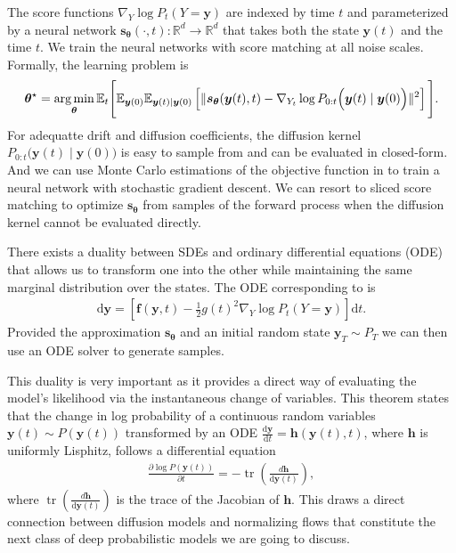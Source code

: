 The score functions $\nabla_Y \log P_t(Y=\bm{y})$ are indexed by time $t$ and parameterized by a neural network $\bm{s}_{\bm{\theta}}(\cdot, t) : \mathbb{R}^d \rightarrow \mathbb{R}^d$ that takes both the state $\bm{y}(t)$ and the time $t$. We train the neural networks with score matching at all noise scales. Formally, the learning problem is
\begin{align}
  \bm{\theta}^\star = \operatorname*{arg\,min}_{\bm{\theta}} \mathbb{E}_t\Bigg[ \mathbb{E}_{\bm{y}(0)} \mathbb{E}_{\bm{y}(t)\mid \bm{y}(0)}\left[ \lVert \bm{s}_{\bm{\theta}}(\bm{y}(t), t) - \nabla_{Y_t} \log P_{0:t}\Big(\bm{y}(t) \mid \bm{y}(0)\Big) \rVert^2 \right] \Bigg]. \label{eq:continuous_diffusion_objective}
\end{align}
For adequatte drift and diffusion coefficients, the diffusion kernel $P_{0:t}\Big(\bm{y}(t) \mid \bm{y}(0)\Big)$ is easy to sample from and can be evaluated in closed-form. And we can use Monte Carlo estimations of the objective function in  to train a neural network with stochastic gradient descent. We can resort to sliced score matching \citep{song2020sliced} to optimize $\bm{s}_{\bm{\theta }}$ from samples of the forward process when the diffusion kernel cannot be evaluated directly.

There exists a duality between SDEs and ordinary differential equations (ODE) that allows us to transform one into the other while maintaining the same marginal distribution over the states. The ODE corresponding to  is
\begin{align}
  \text{d}\bm{y} = \left[ \bm{f}(\bm{y}, t) - \frac{1}{2}g(t)^2 \nabla_Y \log P_t(Y=\bm{y}) \right] \text{d}t.
\end{align}
Provided the approximation $\bm{s}_{\bm{\theta}}$ and an initial random state $\bm{y}_T \sim P_T$ we can then use an ODE solver to generate samples.

This duality is very important as it provides a direct way of evaluating the model's likelihood via the instantaneous change of variables. This theorem states that the change in log probability of a continuous random variables $\bm{y}(t) \sim P(\bm{y}(t))$ transformed by an ODE $\frac{\text{d}\bm{y}}{\text{d}t} = \bm{h}(\bm{y}(t), t)$, where $\bm{h}$ is uniformly Lisphitz, follows a differential equation
\begin{align}
  \frac{\partial \log P(\bm{y}(t))}{\partial t} = -\operatorname{tr}(\frac{d\bm{h}}{\text{d}\bm{y}(t)}), \label{eq:NODE_NF}
\end{align}
where $\operatorname{tr}(\frac{d\bm{h}}{\text{d}\bm{y}(t)})$ is the trace of the Jacobian of $\bm{h}$. This draws a direct connection between diffusion models and normalizing flows that constitute the next class of deep probabilistic models we are going to discuss.

